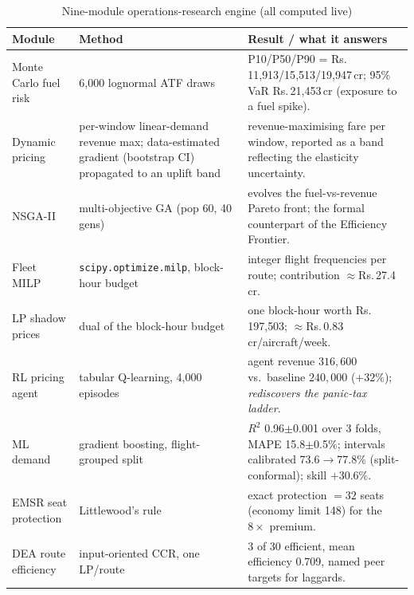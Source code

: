 \documentclass[conference]{IEEEtran}
\newcommand{\INR}{\mbox{Rs.}}
\newcommand{\cr}{\,cr}        %
\begin{document}
\begin{table}[!t]
\caption{Nine-module operations-research engine (all computed live)}
\label{tab:or}
\centering
\renewcommand{\arraystretch}{1.2}
\begin{tabular}{@{}llp{9.2cm}@{}}
\toprule
\textbf{Module} & \textbf{Method} & \textbf{Result / what it answers}\\
\midrule
Monte Carlo fuel risk & 6{,}000 lognormal ATF draws & P10/P50/P90 = \INR{}\,11{,}913/15{,}513/19{,}947\cr{}; 95\% VaR \INR{}\,21{,}453\cr{} (exposure to a fuel spike).\\
Dynamic pricing & per-window linear-demand revenue max; data-estimated gradient (bootstrap CI) propagated to an uplift band & revenue-maximising fare per window, reported as a band reflecting the elasticity uncertainty.\\
NSGA-II & multi-objective GA (pop 60, 40 gens) & evolves the fuel-vs-revenue Pareto front; the formal counterpart of the Efficiency Frontier.\\
Fleet MILP & \texttt{scipy.optimize.milp}, block-hour budget & integer flight frequencies per route; contribution $\approx$\INR{}\,27.4\cr{}.\\
LP shadow prices & dual of the block-hour budget & one block-hour worth \INR{}\,197{,}503; $\approx$\INR{}\,0.83\cr{}/aircraft/week.\\
RL pricing agent & tabular Q-learning, 4{,}000 episodes & agent revenue $316{,}600$ vs.\ baseline $240{,}000$ ($+32\%$); \emph{rediscovers the panic-tax ladder}.\\
ML demand & gradient boosting, flight-grouped split & $R^2$ 0.96$\pm$0.001 over 3 folds, MAPE 15.8$\pm$0.5\%; intervals calibrated 73.6$\to$77.8\% (split-conformal); skill $+30.6\%$.\\
EMSR seat protection & Littlewood's rule & exact protection $=32$ seats (economy limit 148) for the $8\times$ premium.\\
DEA route efficiency & input-oriented CCR, one LP/route & 3 of 30 efficient, mean efficiency 0.709, named peer targets for laggards.\\
\bottomrule
\end{tabular}
\end{table}
\end{document}
